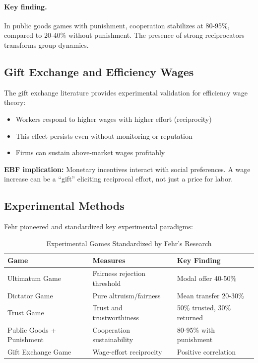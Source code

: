 \paragraph{Key finding.} In public goods games with punishment, cooperation
stabilizes at 80-95\%, compared to 20-40\% without punishment. The presence
of strong reciprocators transforms group dynamics.

\subsection{Gift Exchange and Efficiency Wages}
\label{sec:feh-gift}

The gift exchange literature \citep{fehr1993reciprocity, fehr1998reciprocity}
provides experimental validation for efficiency wage theory:

\begin{itemize}[nosep]
    \item Workers respond to higher wages with higher effort (reciprocity)
    \item This effect persists even without monitoring or reputation
    \item Firms can sustain above-market wages profitably
\end{itemize}

\textbf{EBF implication:} Monetary incentives interact with social preferences.
A wage increase can be a ``gift'' eliciting reciprocal effort, not just a
price for labor.

\subsection{Experimental Methods}
\label{sec:feh-methods}

Fehr pioneered and standardized key experimental paradigms:

\begin{table}[htbp]
\centering
\caption{Experimental Games Standardized by Fehr's Research}
\label{tab:feh-games}
\begin{tabular}{@{}lll@{}}
\toprule
\textbf{Game} & \textbf{Measures} & \textbf{Key Finding} \\
\midrule
Ultimatum Game & Fairness rejection threshold & Modal offer 40-50\% \\
Dictator Game & Pure altruism/fairness & Mean transfer 20-30\% \\
Trust Game & Trust and trustworthiness & 50\% trusted, 30\% returned \\
Public Goods + Punishment & Cooperation sustainability & 80-95\% with punishment \\
Gift Exchange Game & Wage-effort reciprocity & Positive correlation \\
\bottomrule
\end{tabular}
\end{table}

